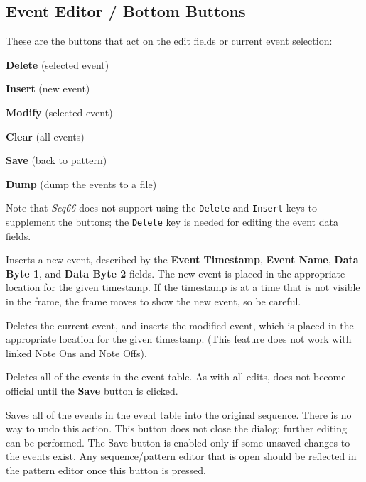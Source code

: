 \subsection{Event Editor / Bottom Buttons}
\label{subsec:event_editor_buttons}

   These are the buttons that act on the edit fields or current event
   selection:

   \begin{enumber}
      \item \textbf{Delete} (selected event)
      \item \textbf{Insert} (new event)
      \item \textbf{Modify} (selected event)
      \item \textbf{Clear} (all events)
      \item \textbf{Save} (back to pattern)
      \item \textbf{Dump} (dump the events to a file)
   \end{enumber}

   Note that
   \textsl{Seq66} does not support using the
   \texttt{Delete} and \texttt{Insert} keys to
   supplement the buttons; the \texttt{Delete}
   key is needed for editing the event data fields.

   \setcounter{ItemCounter}{0}      %

   Inserts a new event, described by the 
   \textbf{Event Timestamp},
   \textbf{Event Name},
   \textbf{Data Byte 1}, and
   \textbf{Data Byte 2} fields.
   The new event is placed in the appropriate location for the given timestamp.
   If the timestamp is at a time that is not visible in the frame, the frame
   moves to show the new event, so be careful.

   Deletes the current event, and inserts the modified event,
   which is placed in the appropriate location for the given
   timestamp.  (This feature does not work with linked Note Ons and Note Offs).

   Deletes all of the events in the event table.
   As with all edits, does not become official until the \textbf{Save} button
   is clicked.

   Saves all of the events in the event table into the original sequence.
   There is no way to undo this action.
   This button does not close the dialog; further
   editing can be performed.  The Save button is enabled only if
   some unsaved changes to the events exist.
   Any sequence/pattern editor that is open should be reflected
   in the pattern editor once this button is pressed.

